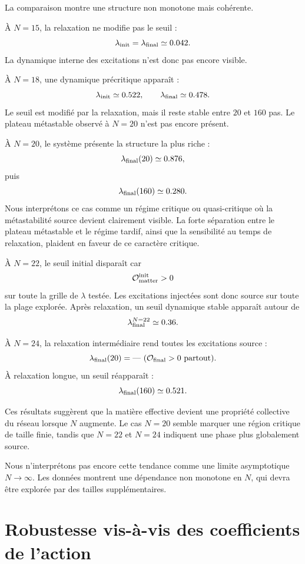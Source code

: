\documentclass[11pt,a4paper]{article}
\begin{document}
La comparaison montre une structure non monotone mais cohérente.

À \(N=15\), la relaxation ne modifie pas le seuil :
\[
\lambda_{\rm init}
=
\lambda_{\rm final}
\simeq0.042.
\]
La dynamique interne des excitations n'est donc pas encore visible.

À \(N=18\), une dynamique précritique apparaît :
\[
\lambda_{\rm init}\simeq0.522,
\qquad
\lambda_{\rm final}\simeq0.478.
\]
Le seuil est modifié par la relaxation, mais il reste stable entre \(20\) et
\(160\) pas. Le plateau métastable observé à \(N=20\) n'est pas encore présent.

À \(N=20\), le système présente la structure la plus riche :
\[
\lambda_{\rm final}(20)\simeq0.876,
\]
puis
\[
\lambda_{\rm final}(160)\simeq0.280.
\]
Nous interprétons ce cas comme un régime critique ou quasi-critique où la
métastabilité source devient clairement visible. La forte séparation entre
le plateau métastable et le régime tardif, ainsi que la sensibilité au temps
de relaxation, plaident en faveur de ce caractère critique.

À \(N=22\), le seuil initial disparaît car
\[
\mathcal{O}_{\rm matter}^{\rm init}>0
\]
sur toute la grille de \(\lambda\) testée. Les excitations injectées sont donc
source sur toute la plage explorée. Après relaxation, un seuil dynamique
stable apparaît autour de
\[
\lambda_{\rm final}^{N=22}\simeq0.36.
\]

À \(N=24\), la relaxation intermédiaire rend toutes les excitations source :
\[
\lambda_{\rm final}(20)=\text{—}\ (\mathcal{O}_{\rm final}>0\ \text{partout}).
\]
À relaxation longue, un seuil réapparaît :
\[
\lambda_{\rm final}(160)\simeq0.521.
\]

Ces résultats suggèrent que la matière effective devient une propriété
collective du réseau lorsque \(N\) augmente. Le cas \(N=20\) semble marquer une
région critique de taille finie, tandis que \(N=22\) et \(N=24\) indiquent une
phase plus globalement source.

Nous n'interprétons pas encore cette tendance comme une limite asymptotique
\(N\to\infty\). Les données montrent une dépendance non monotone en \(N\), qui
devra être explorée par des tailles supplémentaires.

\section{Robustesse vis-à-vis des coefficients de l'action}
\end{document}

